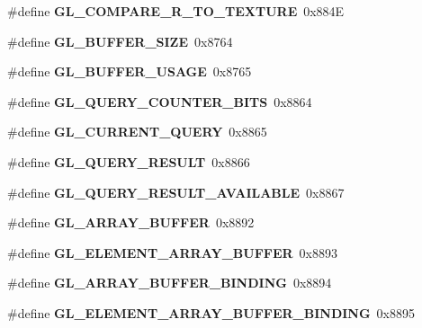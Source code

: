 \begin{DoxyCompactItemize}
\item 
\#define {\bfseries G\+L\+\_\+\+C\+O\+M\+P\+A\+R\+E\+\_\+\+R\+\_\+\+T\+O\+\_\+\+T\+E\+X\+T\+U\+R\+E}~0x884\+E\label{_s_d_l__opengl_8h_a1dc7d6e1f3357d3b9e686b800d2d4ae4}

\item 
\#define {\bfseries G\+L\+\_\+\+B\+U\+F\+F\+E\+R\+\_\+\+S\+I\+Z\+E}~0x8764\label{_s_d_l__opengl_8h_a97c3f50440fbe7eb098cfeede90d1686}

\item 
\#define {\bfseries G\+L\+\_\+\+B\+U\+F\+F\+E\+R\+\_\+\+U\+S\+A\+G\+E}~0x8765\label{_s_d_l__opengl_8h_a3c6158f6c9440fe495d4e14c2dea95a3}

\item 
\#define {\bfseries G\+L\+\_\+\+Q\+U\+E\+R\+Y\+\_\+\+C\+O\+U\+N\+T\+E\+R\+\_\+\+B\+I\+T\+S}~0x8864\label{_s_d_l__opengl_8h_affc3fd3d326f4bc17ec3ae70f64e3f02}

\item 
\#define {\bfseries G\+L\+\_\+\+C\+U\+R\+R\+E\+N\+T\+\_\+\+Q\+U\+E\+R\+Y}~0x8865\label{_s_d_l__opengl_8h_a3a40361f1742ce1d96079817f5b02640}

\item 
\#define {\bfseries G\+L\+\_\+\+Q\+U\+E\+R\+Y\+\_\+\+R\+E\+S\+U\+L\+T}~0x8866\label{_s_d_l__opengl_8h_a5f22b4318913632dfd529bc7536fa1d6}

\item 
\#define {\bfseries G\+L\+\_\+\+Q\+U\+E\+R\+Y\+\_\+\+R\+E\+S\+U\+L\+T\+\_\+\+A\+V\+A\+I\+L\+A\+B\+L\+E}~0x8867\label{_s_d_l__opengl_8h_aa3b4655feeeed8b7e7e981c994af1731}

\item 
\#define {\bfseries G\+L\+\_\+\+A\+R\+R\+A\+Y\+\_\+\+B\+U\+F\+F\+E\+R}~0x8892\label{_s_d_l__opengl_8h_a7180045dcb52b22af2cd0366026bc3ed}

\item 
\#define {\bfseries G\+L\+\_\+\+E\+L\+E\+M\+E\+N\+T\+\_\+\+A\+R\+R\+A\+Y\+\_\+\+B\+U\+F\+F\+E\+R}~0x8893\label{_s_d_l__opengl_8h_ad26c63125c72cbf0347b589d51676e6a}

\item 
\#define {\bfseries G\+L\+\_\+\+A\+R\+R\+A\+Y\+\_\+\+B\+U\+F\+F\+E\+R\+\_\+\+B\+I\+N\+D\+I\+N\+G}~0x8894\label{_s_d_l__opengl_8h_a5ecd4619421b6ddb35898ec4d38a9815}

\item 
\#define {\bfseries G\+L\+\_\+\+E\+L\+E\+M\+E\+N\+T\+\_\+\+A\+R\+R\+A\+Y\+\_\+\+B\+U\+F\+F\+E\+R\+\_\+\+B\+I\+N\+D\+I\+N\+G}~0x8895\label{_s_d_l__opengl_8h_a2af45d6380eba1087a8e5bc684d6ab72}


\end{DoxyCompactItemize}
